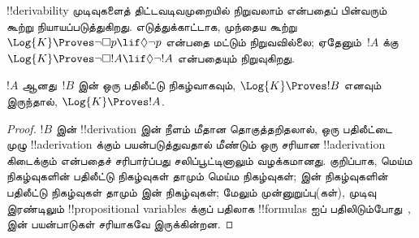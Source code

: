 \documentclass[../../../include/open-logic-section]{subfiles}
\begin{document}
!!{derivability} முடிவுகளைத் திட்டவடிவமுறையில் நிறுவலாம் என்பதைப் பின்வரும்
கூற்று நியாயப்படுத்துகிறது. எடுத்துக்காட்டாக, முந்தைய கூற்று
$\Log{K} \Proves \lnot\Box p \lif \Diamond \lnot p$ என்பதை மட்டும்
நிறுவவில்லை; ஏதேனும்~$!A$ க்கு $\Log{K} \Proves \lnot\Box !A \lif
\Diamond \lnot !A$ என்பதையும் நிறுவுகிறது.

\begin{prop}
  $!A$ ஆனது~$!B$ இன் ஒரு பதிலீட்டு நிகழ்வாகவும், $\Log{K} \Proves !B$
  எனவும் இருந்தால், $\Log{K} \Proves !A$.
\end{prop}

\begin{proof}
  $!B$ இன் !!{derivation} இன் நீளம் மீதான தொகுத்தறிதலால், ஒரு
  பதிலீட்டை முழு !!a{derivation} க்கும் பயன்படுத்துவதால் மீண்டும் ஒரு
  சரியான !!a{derivation} கிடைக்கும் என்பதைச் சரிபார்ப்பது சலிப்பூட்டினாலும்
  வழக்கமானது. குறிப்பாக, மெய்ம நிகழ்வுகளின் பதிலீட்டு நிகழ்வுகள் தாமும்
  மெய்ம நிகழ்வுகள்;  இன்
  நிகழ்வுகளின் பதிலீட்டு நிகழ்வுகள் தாமும்
   இன் நிகழ்வுகள்; மேலும்
  முன்னுறுப்பு(கள்), முடிவு இரண்டிலும் !!{propositional variable}s க்குப்
  பதிலாக !!{formula}s ஐப் பதிலிடும்போது~\MP{}, \Nec{} இன் பயன்பாடுகள்
  சரியாகவே இருக்கின்றன.
\end{proof}
\end{document}

